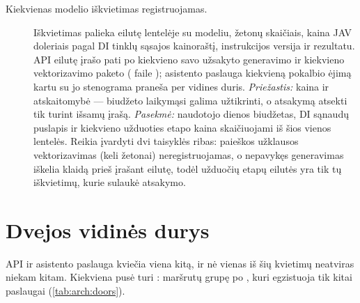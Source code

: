 \begin{description}
  \item[Kiekvienas modelio iškvietimas registruojamas.]
    Iškvietimas palieka eilutę lentelėje  su modeliu, žetonų skaičiais, kaina
    JAV doleriais pagal DI tinklų sąsajos kainoraštį, instrukcijos versija ir rezultatu. API
    eilutę įrašo pati po kiekvieno savo užsakyto generavimo ir kiekvieno vektorizavimo paketo
    ( faile ); asistento paslauga kiekvieną
    pokalbio ėjimą kartu su jo stenograma praneša per vidines duris. \emph{Priežastis:} kaina
    ir atskaitomybė --- biudžeto laikymąsi galima užtikrinti, o atsakymą atsekti tik turint išsamų
    įrašą. \emph{Pasekmė:} naudotojo dienos biudžetas, DI sąnaudų puslapis ir kiekvieno
    užduoties etapo kaina skaičiuojami iš šios vienos lentelės. Reikia įvardyti dvi taisyklės
    ribas: paieškos užklausos vektorizavimas (keli žetonai) neregistruojamas, o nepavykęs
    generavimas iškelia klaidą prieš įrašant eilutę, todėl užduočių etapų eilutės yra tik tų
    iškvietimų, kurie sulaukė atsakymo.
\end{description}

\section{Dvejos vidinės durys}\label{sec:arch:doors}

API ir asistento paslauga kviečia viena kitą, ir nė vienas iš šių kvietimų neatviras niekam
kitam. Kiekviena pusė turi : maršrutų grupę po , kuri
egzistuoja tik kitai paslaugai (\cref{tab:arch:doors}).


